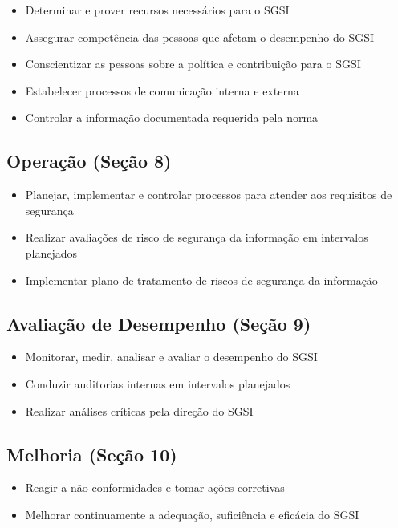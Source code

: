 \documentclass[12pt,a4paper]{report}
\begin{document}
\begin{itemize}
  \item Determinar e prover recursos necessários para o SGSI
  \item Assegurar competência das pessoas que afetam o desempenho do SGSI
  \item Conscientizar as pessoas sobre a política e contribuição para o SGSI
  \item Estabelecer processos de comunicação interna e externa
  \item Controlar a informação documentada requerida pela norma
\end{itemize}

\subsection{Operação (Seção 8)}

\begin{itemize}
  \item Planejar, implementar e controlar processos para atender aos requisitos de segurança
  \item Realizar avaliações de risco de segurança da informação em intervalos planejados
  \item Implementar plano de tratamento de riscos de segurança da informação
\end{itemize}

\subsection{Avaliação de Desempenho (Seção 9)}

\begin{itemize}
  \item Monitorar, medir, analisar e avaliar o desempenho do SGSI
  \item Conduzir auditorias internas em intervalos planejados
  \item Realizar análises críticas pela direção do SGSI
\end{itemize}

\subsection{Melhoria (Seção 10)}

\begin{itemize}
  \item Reagir a não conformidades e tomar ações corretivas
  \item Melhorar continuamente a adequação, suficiência e eficácia do SGSI
\end{itemize}
\end{document}

